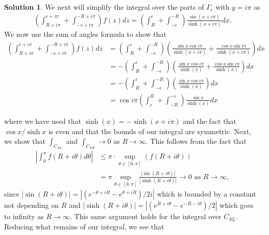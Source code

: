 \documentclass[12pt]{article}
\newcommand{\abs}[1]{ \left| #1 \right| }
\theoremstyle{definition}
\newtheorem{sol}{Solution}
\theoremstyle{remark}
\begin{document}
\begin{sol}
    We next will simplify the integral over the parts of $\Gamma_\epsilon$ with $y=i\pi$ as
\begin{align}
    \left( \int_{R+i\pi}^{\epsilon + i\pi} + \int_{- \epsilon + i\pi}^{-R + i\pi} \right) f(z)dz =     \left( \int_{R}^{\epsilon} + \int_{- \epsilon}^{-R } \right)  \frac{\sin(x + i\pi)}{\sinh(x+i\pi)} dx.
\end{align}
We now use the sum of angles formula to show that 
\begin{align}
    \left( \int_{R+i\pi}^{\epsilon + i\pi} + \int_{- \epsilon + i\pi}^{-R + i\pi} \right) f(z)dz &=     \left( \int_{R}^{\epsilon} + \int_{- \epsilon}^{-R } \right) \left(\frac{\sin x\cos i\pi}{\sinh(x+i\pi)} + \frac{\cos x\sin i\pi}{\sinh(x+i\pi)}    \right)dx\\
                                                                                                &=-     \left( \int_{R}^{\epsilon} + \int_{- \epsilon}^{-R } \right) \left(\frac{\sin x\cos i\pi}{\sinh(x)} + \frac{\cos x\sin i\pi}{\sinh(x)}    \right)dx \\
                                                                                                &=-     \left( \int_{R}^{\epsilon} + \int_{- \epsilon}^{-R } \right) \left(\frac{\sin x\cos i\pi}{\sinh(x)}   \right)dx \\
                                                                                                &=\cos i\pi   \left( \int_{\epsilon}^{R} + \int_{-R }^{-\epsilon} \right) \frac{\sin x}{\sinh(x)} dx
\end{align} 

where we have used that $\sinh(x) = -\sinh(x+i\pi)$ and the fact that $\cos x / \sinh x$ is even and that the bounds of our integral are symmetric. Next, we show that $\int_{C_{SL}}$ and $\int_{C_{SR}} \to 0$ as $R\to \infty$. This follows from the fact that 
\begin{align}
    \abs{\int_{0}^{\pi} f(R + i\theta)d\theta } &\leq \pi \cdot \sup_{\theta\in [0,\pi]}( f(R+i\theta))\\
                                                &= \pi \sup_{\theta\in [0,\pi]}\frac{\abs{\sin(R + i\theta)}}{\abs{\sinh(R+i\theta)}}
                                                \to 0 \text{ as } R\to \infty,
\end{align}
since $\abs{\sin(R+i\theta)} = \abs{(e^{-\theta +iR} - e^{\theta + iR})/2i}$ which is bounded by a constant not depending on $R$ and $\abs{\sinh(R + i\theta)} = \abs{(e^{R +i\theta} - e^{-R - i\theta}) / 2 }$ which goes to infinity as $R\to\infty$. This same argument holds for the integral over $C_{SL}$.
Reducing what remains of our integral, we see that 


\end{sol}
\end{document}
